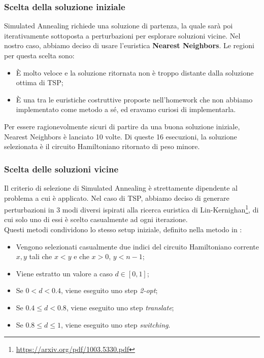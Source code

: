 \subsubsection{Scelta della soluzione iniziale}

Simulated Annealing richiede una soluzione di partenza, la quale sarà poi iterativamente sottoposta a perturbazioni per esplorare soluzioni vicine. Nel nostro caso, abbiamo deciso di usare l'euristica \textbf{Nearest Neighbors}. Le regioni per questa scelta sono:

\begin{itemize}
    \item È molto veloce e la soluzione ritornata non è troppo distante dalla soluzione ottima di TSP;
    \item È una tra le euristiche costruttive proposte nell'homework che non abbiamo implementato come metodo a sé, ed eravamo curiosi di implementarla.
\end{itemize}

Per essere ragionevolmente sicuri di partire da una buona soluzione iniziale, Nearest Neighbors è lanciato 10 volte. Di queste 16 esecuzioni, la soluzione selezionata è il circuito Hamiltoniano ritornato di peso minore.

\subsubsection{Scelta delle soluzioni vicine}

Il criterio di selezione di Simulated Annealing è strettamente dipendente al problema a cui è applicato. Nel caso di TSP, abbiamo deciso di generare perturbazioni in 3 modi diversi ispirati alla ricerca euristica di Lin-Kernighan\footnote{\url{https://arxiv.org/pdf/1003.5330.pdf}}, di cui solo uno di essi è scelto casualmente ad ogni iterazione. \\

\noindent Questi metodi condividono lo stesso setup iniziale, definito nella metodo  in :

\begin{itemize}
    \item Vengono selezionati casualmente due indici del circuito Hamiltoniano corrente $x, y$ tali che $x < y$ e che $x > 0$, $y < n - 1$;
    \item Viene estratto un valore a caso $d \in [0, 1]$;
    \item Se $0 < d < 0.4$, viene eseguito uno step \textit{2-opt};
    \item Se $0.4 \leq d < 0.8$, viene eseguito uno step \textit{translate};
    \item Se $0.8 \leq d \leq 1$, viene eseguito uno step \textit{switching}.
\end{itemize}

